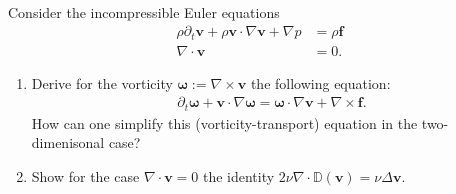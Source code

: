\documentclass[12pt]{article}
\newcommand{\bv}{\boldsymbol{v}}
\newcommand{\bomega}{\boldsymbol{\omega}}
\newenvironment{exercise}[2][Exercise]{\begin{trivlist}
\item[\hskip \labelsep {\bfseries #1}\hskip \labelsep {\bfseries #2.}]}{\end{trivlist}}
\begin{document}
\begin{exercise}{3}~\\
Consider the incompressible Euler equations
\begin{align*}
 \rho \partial_t \bv + \rho \bv \cdot \nabla \bv +\nabla p &= \rho \boldsymbol{f}\\
 \nabla \cdot \bv  &= 0.
\end{align*}
\begin{enumerate}
\item Derive for the vorticity $\bomega := \nabla \times \bv$ the following equation:
 \begin{align*}
 \partial_t \bomega + \bv \cdot \nabla \bomega = \bomega \cdot \nabla \bv + \nabla \times \boldsymbol{f}.
\end{align*}
How can one simplify this (vorticity-transport) equation in the two-dimenisonal case?
\item Show for the case $\nabla \cdot \bv = 0$ the identity $2\nu \nabla \cdot \mathbb{D}(\bv) = \nu\Delta \bv$.
\end{enumerate}
\end{exercise}
\end{document}
